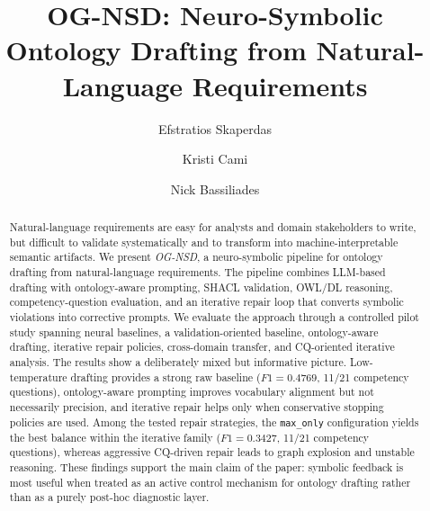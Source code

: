 \documentclass[sigconf]{acmart}
\title{OG-NSD: Neuro-Symbolic Ontology Drafting from Natural-Language Requirements}
\author{Efstratios Skaperdas}
\author{Kristi Cami}
\author{Nick Bassiliades}
\affiliation{%
  \institution{Department of Informatics, Aristotle University of Thessaloniki, Greece}%
  \country{Greece}}
\begin{document}
\begin{abstract}
Natural-language requirements are easy for analysts and domain stakeholders to write, but difficult to validate systematically and to transform into machine-interpretable semantic artifacts. We present \emph{OG-NSD}, a neuro-symbolic pipeline for ontology drafting from natural-language requirements. The pipeline combines LLM-based drafting with ontology-aware prompting, SHACL validation, OWL/DL reasoning, competency-question evaluation, and an iterative repair loop that converts symbolic violations into corrective prompts. We evaluate the approach through a controlled pilot study spanning neural baselines, a validation-oriented baseline, ontology-aware drafting, iterative repair policies, cross-domain transfer, and CQ-oriented iterative analysis. The results show a deliberately mixed but informative picture. Low-temperature drafting provides a strong raw baseline ($F1 = 0.4769$, 11/21 competency questions), ontology-aware prompting improves vocabulary alignment but not necessarily precision, and iterative repair helps only when conservative stopping policies are used. Among the tested repair strategies, the \texttt{max\_only} configuration yields the best balance within the iterative family ($F1 = 0.3427$, 11/21 competency questions), whereas aggressive CQ-driven repair leads to graph explosion and unstable reasoning. These findings support the main claim of the paper: symbolic feedback is most useful when treated as an active control mechanism for ontology drafting rather than as a purely post-hoc diagnostic layer.
\end{abstract}


\maketitle




% 
% 
% 
% 
% 


\end{document}
